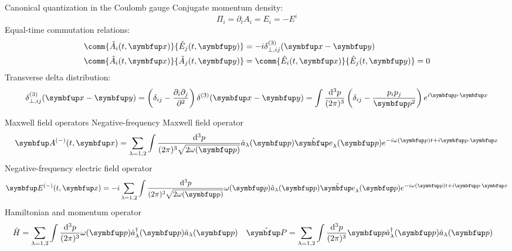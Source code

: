\documentclass[aspectratio=169,usenames,dvipsnames]{beamer}
\begin{document}
	\begin{frame}{Canonical quantization in the Coulomb gauge}
		Conjugate momentum density:
		\begin{equation}
			\Pi_i
			=
			\partial_t A_i
			=
			E_i
			=
			-
			E^i
		\end{equation}
		Equal-time commutation relations:
		\begin{align}
			\comm{\hat{A}_i(t,\vb{x})}{\hat{E}_j(t,\vb{y})}
			&=
			-i
			\delta_{\perp,ij}^{(3)}(\vb{x}-\vb{y})
			\\
			\comm{\hat{A}_i(t,\vb{x})}{\hat{A}_j(t,\vb{y})}
			&=
			\comm{\hat{E}_i(t,\vb{x})}{\hat{E}_j(t,\vb{y})}
			=
			0
		\end{align}
		Transverse delta distribution:
		\begin{equation}
			\delta_{\perp,ij}^{(3)}(\vb{x}-\vb{y})
			=
			\left(
				\delta_{ij}
				-
				\frac{\partial_i\partial_j}{\partial^2}
			\right)
			\delta^{(3)}(\vb{x}-\vb{y})
			=
			\int\frac{\dd[3]{p}}{(2\pi)^3}
			\left(
				\delta_{ij}
				-
				\frac{p_ip_j}{\vb{p}^2}
			\right)
			e^{i\vb{p}\vdot\vb{x}}
		\end{equation}
	\end{frame}
	
	\begin{frame}{Maxwell field operators}
		Negative-frequency Maxwell field operator
		\begin{equation}
			\vb{A}^{(-)}(t,\vb{x})
			=
			\sum_{\lambda=1,2}
			\int\frac{\dd[3]{p}}{(2\pi)^3\sqrt{2\omega(\vb{p})}}
			\hat{a}_\lambda(\vb{p})
			\vu{e}_\lambda(\vb{p})
			e^{-i\omega(\vb{p})t+i\vb{p}\vdot\vb{x}}
		\end{equation}
		Negative-frequency electric field operator
		\begin{equation}
			\vb{E}^{(-)}(t,\vb{x})
			=
			-i
			\sum_{\lambda=1,2}
			\int\frac{\dd[3]{p}}{(2\pi)^3\sqrt{2\omega(\vb{p})}}
			\omega(\vb{p})
			\hat{a}_\lambda(\vb{p})
			\vu{e}_\lambda(\vb{p})
			e^{-i\omega(\vb{p})t+i\vb{p}\vdot\vb{x}}
		\end{equation}
		Hamiltonian and momentum operator
		\begin{align}
			\hat{H}
			&=
			\sum_{\lambda=1,2}
			\int\frac{\dd[3]{p}}{(2\pi)^3}
			\omega(\vb{p})
			\hat{a}_\lambda^\dagger(\vb{p})
			\hat{a}_\lambda(\vb{p})
			&
			\vu{P}
			&=
			\sum_{\lambda=1,2}
			\int\frac{\dd[3]{p}}{(2\pi)^3}
			\vb{p}
			\hat{a}_\lambda^\dagger(\vb{p})
			\hat{a}_\lambda(\vb{p})
		\end{align}
	\end{frame}
	
\end{document}
